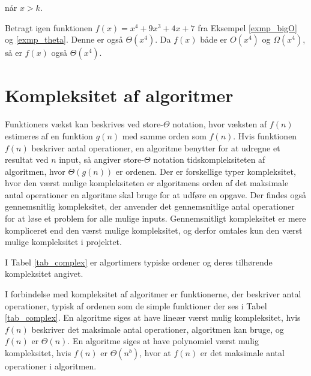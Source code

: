 når $x>k$. \\
\begin{exmp}
Betragt igen funktionen $f(x)=x^4+9x^3+4x+7$ fra Eksempel \ref{exmp_bigO} og \ref{exmp_theta}. Denne er også  $\Theta(x^4)$.
Da $f(x)$ både er $O(x^4)$ og $\Omega (x^4)$, så er $f(x)$ også $\Theta (x^4)$.
\end{exmp}

\section{Kompleksitet af algoritmer}
Funktioners vækst kan beskrives ved store-$\Theta$ notation, hvor væksten af $f(n)$ estimeres af en funktion $g(n)$ med samme orden som $f(n)$. 
Hvis funktionen $f(n)$ beskriver antal operationer, en algoritme benytter for at udregne et resultat ved $n$ input, så angiver store-$\Theta$ notation tidskompleksiteten af algoritmen, hvor $\Theta(g(n))$ er ordenen. 
Der er forskellige typer kompleksitet, hvor den værst mulige kompleksiteten er algoritmens orden af det maksimale antal operationer en algoritme skal bruge for at udføre en opgave. 
Der findes også gennemsnitlig kompleksitet, der anvender det gennemsnitlige antal operationer for at løse et problem for alle mulige inputs.
Gennemsnitligt kompleksitet er mere kompliceret end den værst mulige kompleksitet, og derfor omtales kun den værst mulige kompleksitet i projektet.

I Tabel \ref{tab_complex} er algortimers typiske ordener og deres tilhørende kompleksitet angivet. 



I forbindelse med kompleksitet af algoritmer er funktionerne, der beskriver antal operationer, typisk af ordenen som de simple funktioner der ses i Tabel \ref{tab_complex}. 
En algoritme siges at have lineær værst mulig kompleksitet, hvis $f(n)$ beskriver det maksimale antal operationer,  algoritmen kan bruge, og $f(n)$ er $\Theta(n)$. 
En algoritme siges at have polynomiel værst mulig kompleksitet, hvis $f(n)$ er $\Theta(n^b)$, hvor at $f(n)$ er det maksimale antal operationer i algoritmen.

